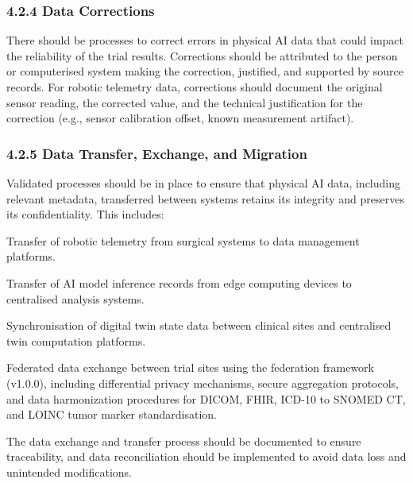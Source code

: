 \subsubsection{4.2.4 Data Corrections}

There should be processes to correct errors in physical AI data that could impact the reliability of the trial results. Corrections should be attributed to the person or computerised system making the correction, justified, and supported by source records. For robotic telemetry data, corrections should document the original sensor reading, the corrected value, and the technical justification for the correction (e.g., sensor calibration offset, known measurement artifact).

\subsubsection{4.2.5 Data Transfer, Exchange, and Migration}

Validated processes should be in place to ensure that physical AI data, including relevant metadata, transferred between systems retains its integrity and preserves its confidentiality. This includes:

\begin{description}[leftmargin=2.5cm,style=sameline]

\item[(a)] Transfer of robotic telemetry from surgical systems to data management platforms.

\item[(b)] Transfer of AI model inference records from edge computing devices to centralised analysis systems.

\item[(c)] Synchronisation of digital twin state data between clinical sites and centralised twin computation platforms.

\item[(d)] Federated data exchange between trial sites using the federation framework (v1.0.0), including differential privacy mechanisms, secure aggregation protocols, and data harmonization procedures for DICOM, FHIR, ICD-10 to SNOMED CT, and LOINC tumor marker standardisation.

\end{description}

The data exchange and transfer process should be documented to ensure traceability, and data reconciliation should be implemented to avoid data loss and unintended modifications.

